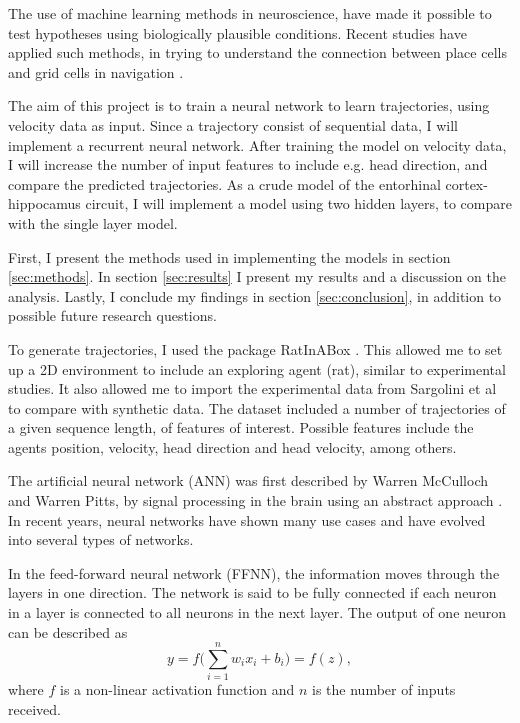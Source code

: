 The use of machine learning methods in neuroscience, have made it possible to test hypotheses using biologically plausible conditions. Recent studies have applied such methods, in trying to understand the connection between place cells and grid cells in navigation \cite{banino:2018:vector_based}. 

The aim of this project is to train a neural network to learn trajectories, using velocity data as input. Since a trajectory consist of sequential data, I will implement a recurrent neural network. After training the model on velocity data, I will increase the number of input features to include e.g. head direction, and compare the predicted trajectories. As a crude model of the entorhinal cortex-hippocamus circuit, I will implement a model using two hidden layers, to compare with the single layer model.

First, I present the methods used in implementing the models in section \ref{sec:methods}. In section \ref{sec:results} I present my  results and a discussion on the analysis. Lastly, I conclude my findings in section \ref{sec:conclusion}, in addition to possible future research questions.



To generate trajectories, I used the package RatInABox \cite{george:2022:ratinabox}. This allowed me to set up a 2D environment to include an exploring agent (rat), similar to experimental studies. It also allowed me to import the experimental data from Sargolini et al \cite{sargolini:2006:conjunctive} to compare with synthetic data. The dataset included a number of trajectories of a given sequence length, of features of interest. Possible features include the agents position, velocity, head direction and head velocity, among others. 

The artificial neural network (ANN) was first described by Warren McCulloch and Warren Pitts, by signal processing in the brain using an abstract approach \cite{mcculloch:1943:logical}. In recent years, neural networks have shown many use cases and have evolved into several types of networks.

In the feed-forward neural network (FFNN), the information moves through the layers in one direction. The network is said to be fully connected if each neuron in a layer is connected to all neurons in the next layer. The output of one neuron can be described as 
\begin{equation}
    y = f \bigg( \sum_{i=1}^{n} w_{i} x_{i} + b_{i} \bigg) = f(z),
\end{equation}
where $f$ is a non-linear activation function and $n$ is the number of inputs received.

